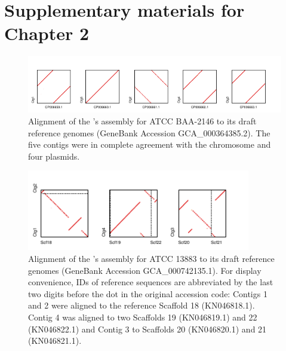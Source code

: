\newcommand{\nocontentsline}[3]{}
\newcommand{\tocless}[2]{\bgroup\let\addcontentsline=\nocontentsline#1{#2}\egroup}
\fancyhf{}
\fancyhead[LE,RO]{\nouppercase{\thepage}}

\chapter{Supplementary materials for Chapter 2}\label{app:npscarf}

\newpage

\begin{figure}[!hpt]
\centering
\includegraphics[width=15.84cm]{images/suppFigure1.pdf}
\caption[Alignment of the \npscarf{}'s assembly for \kp{} ATCC BAA-2146 to its reference genomes]{Alignment of the \npscarf{}'s assembly for \kp{} ATCC BAA-2146 to its draft
reference genomes (GeneBank Accession GCA\_000364385.2). The five contigs were
in complete agreement with the chromosome and four plasmids.}
\label{SF:alignKp2146}
\end{figure}

\begin{figure}[!hpt]
\centering
\includegraphics[width=9.76cm]{images/suppFigure2.pdf}
\caption[Alignment of the \npscarf{}'s assembly for \kp{} ATCC 13883 to its reference genomes]{Alignment of the \npscarf{}'s assembly for \kp{} ATCC 13883 to its draft
reference genomes (GeneBank Accession GCA\_000742135.1). 
For display convenience, IDs of reference sequences are abbreviated by the last two digits
before the dot in the original accession code: 
Contigs 1 and 2 were aligned to the reference Scaffold 18 (KN046818.1). 
Contig 4 was aligned to two Scaffolds 19 (KN046819.1) and
22 (KN046822.1) and Contig 3 to Scaffolds 20 (KN046820.1) and 21 (KN046821.1).}
\label{SF:alignKp13883}
\end{figure}


